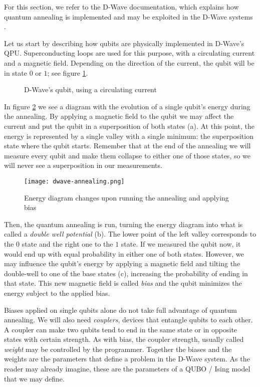 For this section, we refer to the D-Wave documentation, which explains how quantum annealing is implemented and may be exploited in the D-Wave systems \cite{DWaveDoc-QuantumAnnealing}.

Let us start by describing how qubits are physically implemented in D-Wave's QPU. Superconducting loops are used for this purpose, with a circulating current and a magnetic field. Depending on the direction of the current, the qubit will be in state $0$ or $1$; see figure \ref{fig:dwave-qubit}.

\begin{figure}[h]
	\centering
	\caption{D-Wave's qubit, using a circulating current \cite{DWaveDoc-QuantumAnnealing}}
	\label{fig:dwave-qubit}
\end{figure}

In figure \ref{fig:dwave-annealing} we see a diagram with the evolution of a single qubit's energy during the annealing. By applying a magnetic field to the qubit we may affect the current and put the qubit in a superposition of both states (a). At this point, the energy is represented by a single valley with a single minimum: the superposition state where the qubit starts. Remember that at the end of the annealing we will measure every qubit and make them collapse to either one of those states, so we will never see a superposition in our measurements.

\begin{figure}[h]
	\texttt{[image: dwave-annealing.png]}
	\centering
	\caption{Energy diagram changes upon running the annealing and applying bias \cite{DWaveDoc-QuantumAnnealing}}
	\label{fig:dwave-annealing}
\end{figure}

Then, the quantum annealing is run, turning the energy diagram into what is called a \emph{double well potential} (b). The lower point of the left valley corresponds to the $0$ state and the right one to the $1$ state. If we measured the qubit now, it would end up with equal probability in either one of both states. However, we may influence the qubit's energy by applying a magnetic field and tilting the double-well to one of the base states (c), increasing the probability of ending in that state. This new magnetic field is called \emph{bias} and the qubit minimizes the energy subject to the applied bias.

Biases applied on single qubits alone do not take full advantage of quantum annealing. We will also need \emph{couplers}, devices that entangle qubits to each other. A coupler can make two qubits tend to end in the same state or in opposite states with certain strength. As with bias, the coupler strength, usually called \emph{weight}  may be controlled by the programmer. Together the biases and the weights are the parameters that define a problem in the D-Wave system. As the reader may already imagine, these are the parameters of a QUBO / Ising model that we may define.


